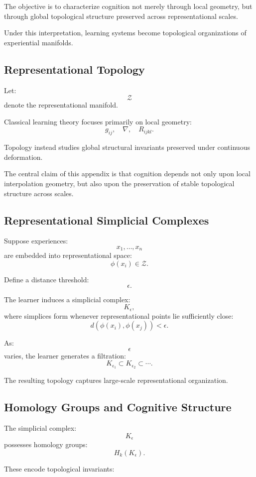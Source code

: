 \documentclass[12pt,a4paper]{article}
\begin{document}
The objective is to characterize cognition not merely through local geometry, but through global topological structure preserved across representational scales.

Under this interpretation, learning systems become topological organizations of experiential manifolds.

\subsection{Representational Topology}

Let:
\[
\mathcal{Z}
\]
denote the representational manifold.

Classical learning theory focuses primarily on local geometry:
\[
g_{ij},
\quad
\nabla,
\quad
R_{ijkl}.
\]

Topology instead studies global structural invariants preserved under continuous deformation.

The central claim of this appendix is that cognition depends not only upon local interpolation geometry, but also upon the preservation of stable topological structure across scales.

\subsection{Representational Simplicial Complexes}

Suppose experiences:
\[
x_1,\ldots,x_n
\]
are embedded into representational space:
\[
\phi(x_i)
\in
\mathcal{Z}.
\]

Define a distance threshold:
\[
\epsilon.
\]

The learner induces a simplicial complex:
\[
K_\epsilon,
\]
where simplices form whenever representational points lie sufficiently close:
\[
d(\phi(x_i),\phi(x_j))
<
\epsilon.
\]

As:
\[
\epsilon
\]
varies, the learner generates a filtration:
\[
K_{\epsilon_1}
\subset
K_{\epsilon_2}
\subset
\cdots.
\]

The resulting topology captures large-scale representational organization.

\subsection{Homology Groups and Cognitive Structure}

The simplicial complex:
\[
K_\epsilon
\]
possesses homology groups:
\[
H_k(K_\epsilon).
\]

These encode topological invariants:
\end{document}
